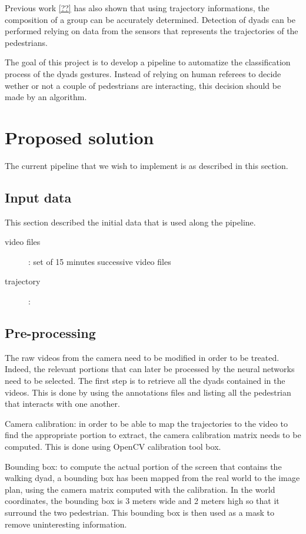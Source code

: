 \documentclass[12pt,a4paper,twoside]{article}
\begin{document}
Previous work \ref{??} has also shown that using trajectory informations, the composition of a group can be accurately determined. Detection of dyads can be performed relying on data from the sensors that represents the trajectories of the pedestrians.

The goal of this project is to develop a pipeline to automatize the classification process of the dyads gestures. Instead of relying on human referees to decide wether or not a couple of pedestrians are interacting, this decision should be made by an algorithm. 

\section{Proposed solution}

The current pipeline that we wish to implement is as described in this section.

\subsection{Input data}
This section described the initial data that is used along the pipeline.
\begin{description}
    \item[video files]: set of 15 minutes successive video files
    \item[trajectory]: 
\end{description}

\subsection{Pre-processing}
The raw videos from the camera need to be modified in order to be treated. Indeed, the relevant portions that can later be processed by the neural networks need to be selected. The first step is to retrieve all the dyads contained in the videos. This is done by using the annotations files and listing all the pedestrian that interacts with one another.

Camera calibration: in order to be able to map the trajectories to the video to find the appropriate portion to extract, the camera calibration matrix needs to be computed. This is done using OpenCV calibration tool box. 

Bounding box: to compute the actual portion of the screen that contains the walking dyad, a bounding box has been mapped from the real world to the image plan, using the camera matrix computed with the calibration. In the world coordinates, the bounding box is 3 meters wide and 2 meters high so that it surround the two pedestrian. This bounding box is then used as a mask to remove uninteresting information.
\end{document}
